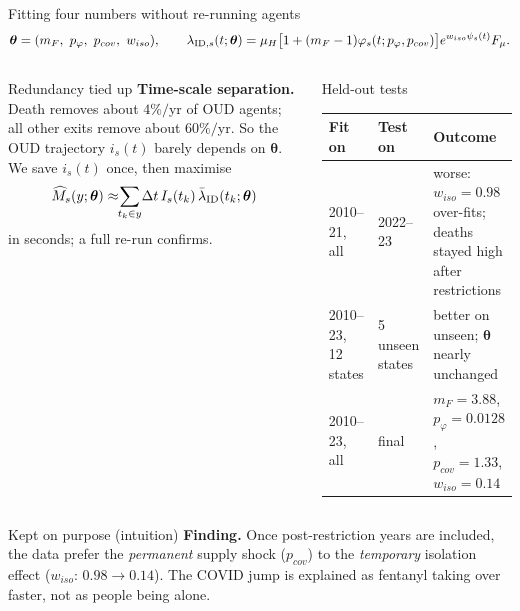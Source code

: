 ﻿\documentclass[9pt,aspectratio=169]{beamer}
\newenvironment{tied}{\begin{alertblock}{Redundancy tied up}\small}{\end{alertblock}}
\newenvironment{kept}{\begin{exampleblock}{Kept on purpose (intuition)}\small}{\end{exampleblock}}
\begin{document}
\begin{frame}{Fitting four numbers without re-running agents}
 \[
  \bm\theta=(m_F,\ p_\varphi,\ p_{cov},\ w_{iso}),\qquad
  \lambda_{\Ic\Dc,s}(t;\bm\theta)=\mu_H\big[1+(m_F-1)\varphi_s(t;p_\varphi,p_{cov})\big]e^{w_{iso}\psi_s(t)}F_\mu .
 \]
 \begin{columns}[T]
 \begin{tied}
  \textbf{Time-scale separation.} Death removes about $4\%/$yr of OUD agents; all other exits remove about $60\%/$yr. So the OUD trajectory $i_s(t)$ barely depends on $\bm\theta$. We save $i_s(t)$ once, then maximise
  \[\widehat M_s(y;\bm\theta)\approx\!\!\sum_{t_k\in y}\!\Delta t\,I_s(t_k)\,\bar\lambda_{\mathrm{I}\mathrm{D}}(t_k;\bm\theta)\]
  in seconds; a full re-run confirms.
 \end{tied}
 \begin{block}{Held-out tests}\tiny
 \renewcommand{\arraystretch}{1.2}
 \begin{tabular}{@{}p{1.6cm}p{1.6cm}p{4.2cm}@{}}
 \toprule Fit on & Test on & Outcome\\\midrule
 2010--21, all & 2022--23 & worse: $w_{iso}=0.98$ over-fits; deaths stayed high after restrictions\\
 2010--23, 12 states & 5 unseen states & better on unseen; $\bm\theta$ nearly unchanged\\
 2010--23, all & final & $m_F{=}3.88$, $p_\varphi{=}0.0128$, $p_{cov}{=}1.33$, $w_{iso}{=}0.14$\\\bottomrule
 \end{tabular}
 \end{block}
 \end{columns}
 \begin{kept}
  \textbf{Finding.} Once post-restriction years are included, the data prefer the \emph{permanent} supply shock ($p_{cov}$) to the \emph{temporary} isolation effect ($w_{iso}$: $0.98\to0.14$). The COVID jump is explained as fentanyl taking over faster, not as people being alone.
 \end{kept}
\end{frame}

\end{document}
